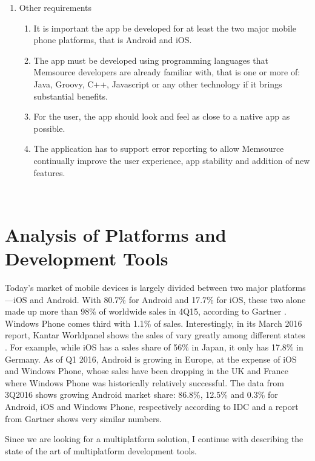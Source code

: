 \begin{enumerate}
\begin{enumerate}[label*=\arabic*.]
	\end{enumerate}
	
	
	
	\item Other requirements
	\begin{enumerate}[label*=\arabic*.]
		\item It is important the app be developed for at least the two major mobile phone platforms, that is Android and iOS.
		\item The app must be developed using programming languages that Memsource developers are already familiar with, that is one or more of: Java, Groovy, C++, Javascript or any other technology if it brings substantial benefits.
		\item For the user, the app should look and feel as close to a native app as possible.
		\item The application has to support error reporting to allow Memsource continually improve the user experience, app stability and addition of new features.
	\end{enumerate}
	
\end{enumerate}
~


\section{Analysis of Platforms and Development Tools}

Today's market of mobile devices is largely divided between two major platforms---iOS and Android. With 80.7\% for Android and 17.7\% for iOS, these two alone made up more than 98\% of worldwide sales in 4Q15, according to Gartner \cite{gartner}. Windows Phone comes third with 1.1\% of sales. Interestingly, in its March 2016 report, Kantar Worldpanel shows the sales of vary greatly among different states \cite{kantar}. For example, while iOS has a sales share of 56\% in Japan, it only has 17.8\% in Germany. As of Q1 2016, Android is growing in Europe, at the expense of iOS and Windows Phone, whose sales have been dropping in the UK and France where Windows Phone was historically relatively successful. The data from 3Q2016 shows growing Android market share: 86.8\%, 12.5\% and 0.3\% for Android, iOS and Windows Phone, respectively according to IDC \cite{idc:marketShare} and a report from Gartner \cite{gartner2} shows very similar numbers.


Since we are looking for a multiplatform solution, I continue with describing the state of the art of multiplatform development tools.

